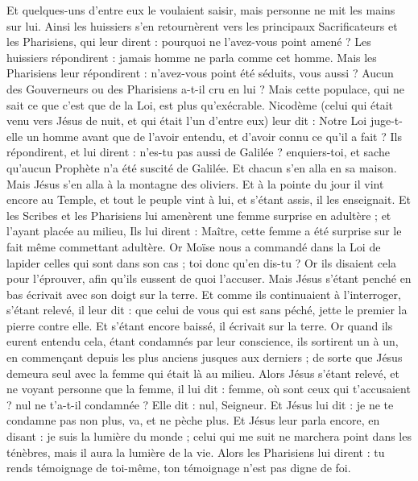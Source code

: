 \begin{multicols}{2}
Et quelques-uns d'entre eux le voulaient saisir, mais personne ne mit les mains sur lui.
Ainsi les huissiers s'en retournèrent vers les principaux Sacrificateurs et les Pharisiens, qui leur dirent : pourquoi ne l'avez-vous point amené ?
Les huissiers répondirent : jamais homme ne parla comme cet homme.
Mais les Pharisiens leur répondirent : n'avez-vous point été séduits, vous aussi ?
Aucun des Gouverneurs ou des Pharisiens a-t-il cru en lui ?
Mais cette populace, qui ne sait ce que c'est que de la Loi, est plus qu'exécrable.
Nicodème (celui qui était venu vers Jésus de nuit, et qui était l'un d'entre eux) leur dit :
Notre Loi juge-t-elle un homme avant que de l'avoir entendu, et d'avoir connu ce qu'il a fait ?
Ils répondirent, et lui dirent : n'es-tu pas aussi de Galilée ? enquiers-toi, et sache qu'aucun Prophète n'a été suscité de Galilée.
Et chacun s'en alla en sa maison.
\VerseOne{}Mais Jésus s'en alla à la montagne des oliviers.
Et à la pointe du jour il vint encore au Temple, et tout le peuple vint à lui, et s'étant assis, il les enseignait.
Et les Scribes et les Pharisiens lui amenèrent une femme surprise en adultère ; et l'ayant placée au milieu,
Ils lui dirent : Maître, cette femme a été surprise sur le fait même commettant adultère.
Or Moïse nous a commandé dans la Loi de lapider celles qui sont dans son cas ; toi donc qu'en dis-tu ?
Or ils disaient cela pour l'éprouver, afin qu'ils eussent de quoi l'accuser. Mais Jésus s'étant penché en bas écrivait avec son doigt sur la terre.
Et comme ils continuaient à l'interroger, s'étant relevé, il leur dit : que celui de vous qui est sans péché, jette le premier la pierre contre elle.
Et s'étant encore baissé, il écrivait sur la terre.
Or quand ils eurent entendu cela, étant condamnés par leur conscience, ils sortirent un à un, en commençant depuis les plus anciens jusques aux derniers ; de sorte que Jésus demeura seul avec la femme qui était là au milieu.
Alors Jésus s'étant relevé, et ne voyant personne que la femme, il lui dit : femme, où sont ceux qui t'accusaient ? nul ne t'a-t-il condamnée ?
Elle dit : nul, Seigneur. Et Jésus lui dit : je ne te condamne pas non plus, va, et ne pèche plus.
Et Jésus leur parla encore, en disant : je suis la lumière du monde ; celui qui me suit ne marchera point dans les ténèbres, mais il aura la lumière de la vie.
Alors les Pharisiens lui dirent : tu rends témoignage de toi-même, ton témoignage n'est pas digne de foi.

\end{multicols}
